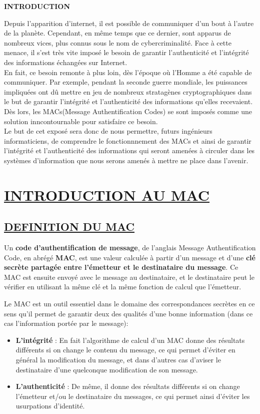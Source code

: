 \begin{center}\textbf{INTRODUCTION}
\end{center}

Depuis l'apparition d'internet, il est possible de communiquer d'un bout à l'autre de la planète. Cependant, en même temps que ce dernier, sont apparus de nombreux vices, plus connus sous le nom de cybercriminalité. Face à cette menace, il s’est très vite imposé le besoin de garantir l’authenticité et l'intégrité des informations échangées sur Internet. \\
En fait, ce besoin remonte à plus loin, dès l'époque où l'Homme a été capable de communiquer. Par exemple, pendant la seconde guerre mondiale, les puissances impliquées ont dû mettre en jeu de nombreux stratagènes cryptographiques dans le but de garantir l'intégrité et l'authenticité des informations qu'elles recevaient. Dès lors, les MACs(Message Authentification Codes) se sont imposés comme une solution inncontournable pour satisfaire ce besoin. \\
Le but de cet exposé sera donc de nous permettre, futurs ingénieurs informaticiens, de comprendre le fonctionnnement des MACs et ainsi de garantir l'intégrité et l'authenticité des informations qui seront amenées à circuler dans les systèmes d'information que nous serons amenés à mettre ne place dans l'avenir.

\newpage

\section{\textbf{\underline{INTRODUCTION AU MAC}}}
\subsection{\textbf{\underline{DEFINITION DU MAC}}}

Un \textbf{code d'authentification de message}, de l'anglais Message Authentification Code, en abrégé \textbf{MAC}, est une valeur calculée à partir d'un message et d'une \textbf{clé secrète partagée entre l'émetteur et le destinataire du message}. Ce MAC est ensuite envoyé avec le message au destinataire, et le destinataire peut le vérifier en utilisant la même clé et la même fonction de calcul que l'émetteur.

Le MAC est un outil essentiel dans le domaine des correspondances secrètes en ce sens qu'il permet de garantir deux des qualités d'une bonne information (dans ce cas l'information portée par le message):
\begin{itemize}[label=$\cdot$]
    \item \textbf{L'intégrité} : En fait l'algorithme de calcul d'un MAC donne des résultats différents si on change le contenu du message, ce qui permet d'éviter en général la modification du message, et dans d'autres cas d'aviser le destinataire d'une quelconque modification de son message.
    \item \textbf{L'authenticité} : De même, il  donne des résultats différents si on change l'émetteur et/ou le destinataire du messages, ce qui permet ainsi d'éviter les usurpations d'identité.
\end{itemize}
